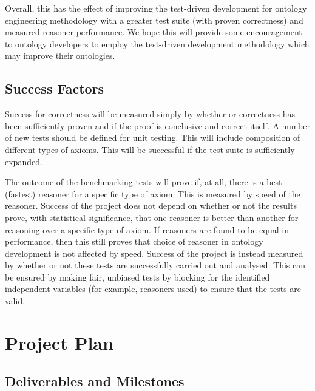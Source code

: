 \documentclass[draft]{sig-alternate}
\begin{document}
Overall, this has the effect of improving the test-driven development for ontology engineering methodology with a greater test suite (with proven correctness) and measured reasoner performance. We hope this will provide some encouragement to ontology developers to employ the test-driven development methodology which may improve their ontologies.

\subsection{Success Factors}

Success for correctness will be measured simply by whether or correctness has been sufficiently proven and if the proof is conclusive and correct itself. A number of new tests should be defined for unit testing. This will include composition of different types of axioms. This will be successful if the test suite is sufficiently expanded.

The outcome of the benchmarking tests will prove if, at all, there is a best (fastest) reasoner for a specific type of axiom. This is measured by speed of the reasoner. Success of the project does not depend on whether or not the results prove, with statistical significance, that one reasoner is better than another for reasoning over a specific type of axiom. If reasoners are found to be equal in performance, then this still proves that choice of reasoner in ontology development is not affected by speed. Success of the project is instead measured by whether or not these tests are successfully carried out and analysed. This can be ensured by making fair, unbiased tests by blocking for the identified independent variables (for example, reasoners used) to ensure that the tests are valid.

\section{Project Plan}

\subsection{Deliverables and Milestones}
\end{document}
